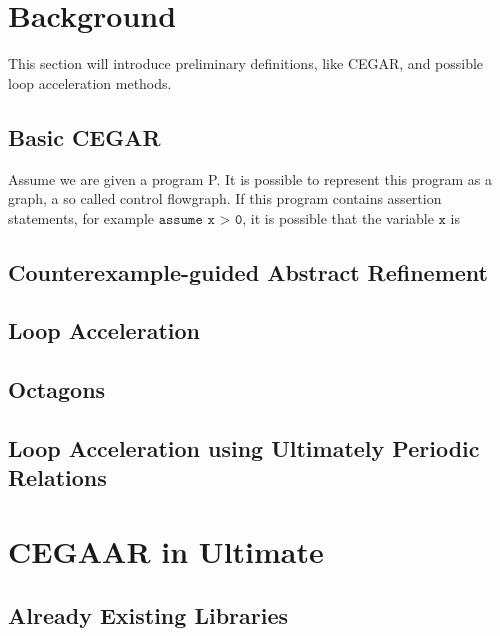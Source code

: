 \documentclass{article}
\newcommand\mycom[1]{}
\newcommand\mycom[1]{#1}
\newcommand{\jw}[1]{\mycom{\todo[color=blue!40,inline]{\small JW: #1}}}
\begin{document}
\section{Background}
This section will introduce preliminary definitions, like CEGAR, and possible loop acceleration methods.
\subsection{Basic CEGAR}
Assume we are given a program P. It is possible to represent this program as a graph, a so called control flowgraph. If this program contains assertion statements, for example $\texttt{assume x > 0}$, it is possible that the variable $\texttt{x}$ is 
\jw{Introducing all needed preliminaries for Cegaar}
\subsection{Counterexample-guided Abstract Refinement}
\jw{Introduction normal Cegar, Showing problems with loops}
\subsection{Loop Acceleration}
\jw{What is loop acceleration? loop acceleration possibilities, overapprox, underapprox, precise. \\ Short introduction, explanation why UPR}
\subsection{Octagons}
\jw{What are octagons, needed for Fast Upr in next section \\ Refers to Claus' Thesis}
\subsection{Loop Acceleration using Ultimately Periodic Relations}
\jw{Precise usage of octagons in ultimately periodic relations \\ Refers to Jill's Thesis}
\pagebreak
\section{CEGAAR in Ultimate}
\jw{Section about using octagons/FastUPR library in Ultimate}
\subsection{Already Existing Libraries}
\jw{references to implementations done for FastUPR and Octagons}
\end{document}
